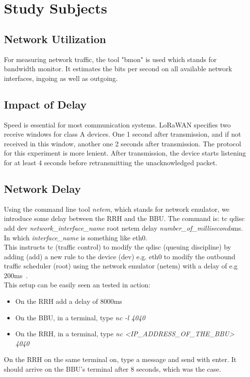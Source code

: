 \section{Study Subjects}
\subsection{Network Utilization}
For measuring network traffic, the tool "bmon" is used which stands for bandwidth monitor.
It estimates the bits per second on all available network interfaces, ingoing as well as outgoing. 
\subsection{Impact of Delay}
Speed is essential for most communication systems.
LoRaWAN specifies two receive windows for class A devices. One 1 second after transmission, and if not
received in this window, another one 2 seconds after transmission.
The protocol for this experiment is more lenient. After transmission, the device starts listening
for at least 4 seconds before retransmitting the unacknowledged packet.
\subsection{Network Delay}
Using the command line tool \emph{netem}, which stands for network emulator, we introduce some delay between the RRH and the BBU.
The command is: tc qdisc add dev \emph{network\_interface\_name} root netem delay \emph{number\_of\_milliseconds}ms. In which \emph{interface\_name} is something like 
eth0. 
\\
This instructs tc (traffic control) to modify the qdisc (queuing discipline) by 
adding (add) a new rule to the device (dev) e.g. eth0 to modify the outbound traffic scheduler (root) using 
the network emulator (netem) with a delay of e.g 200ms~\cite{netem}.
\\
This setup can be easily seen an tested in action:
\begin{itemize}
    \item On the RRH add a delay of 8000ms
    \item On the BBU, in a terminal, type \emph{nc -l 4040}
    \item On the RRH, in a terminal, type \emph{nc <\emph{IP\_ADDRESS\_OF\_THE\_BBU}> 4040}
\end{itemize}

On the RRH on the same terminal on, type a message and send with enter. It should arrive on the BBU's terminal 
after 8 seconds, which was the case. 

